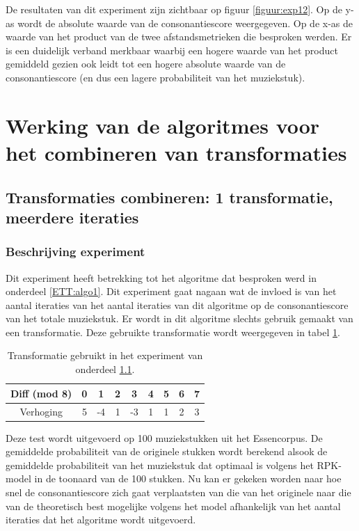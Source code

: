 De resultaten van dit experiment zijn zichtbaar op figuur \ref{figuur:exp12}. Op de y-as wordt de absolute waarde van de consonantiescore weergegeven. Op de x-as de waarde van het product van de twee afstandsmetrieken die besproken werden. Er is een duidelijk verband merkbaar waarbij een hogere waarde van het product gemiddeld gezien ook leidt tot een hogere absolute waarde van de consonantiescore (en dus een lagere probabiliteit van het muziekstuk).

\section{Werking van de algoritmes voor het combineren van transformaties}
\subsection{Transformaties combineren: 1 transformatie, meerdere iteraties}
\label{experiment:1}
\subsubsection{Beschrijving experiment}
Dit experiment heeft betrekking tot het algoritme dat besproken werd in onderdeel \ref{ETT:algo1}. Dit experiment gaat nagaan wat de invloed is van het aantal iteraties van het aantal iteraties van dit algoritme op de consonantiescore van het totale muziekstuk. Er wordt in dit algoritme slechts gebruik gemaakt van een transformatie. Deze gebruikte transformatie wordt weergegeven in tabel \ref{tabel:exp1}.

\begin{table}
  \centering
  \begin{tabular}{c | c c c c c c c c }
    Diff (mod 8) & 0 & 1 & 2 & 3 & 4 & 5 & 6 & 7 \\
    \hline
    \hline
    Verhoging & 5 & -4 & 1 & -3 & 1 & 1 & 2 & 3 \\
  \end{tabular}
  \caption{Transformatie gebruikt in het experiment van onderdeel \ref{experiment:1}.}
  \label{tabel:exp1}
\end{table}

Deze test wordt uitgevoerd op 100 muziekstukken uit het Essencorpus. De gemiddelde probabiliteit van de originele stukken wordt berekend alsook de gemiddelde probabiliteit van het muziekstuk dat optimaal is volgens het RPK-model in de toonaard van de 100 stukken. Nu kan er gekeken worden naar hoe snel de consonantiescore zich gaat verplaatsten van die van het originele naar die van de theoretisch best mogelijke volgens het model afhankelijk van het aantal iteraties dat het algoritme wordt uitgevoerd.

